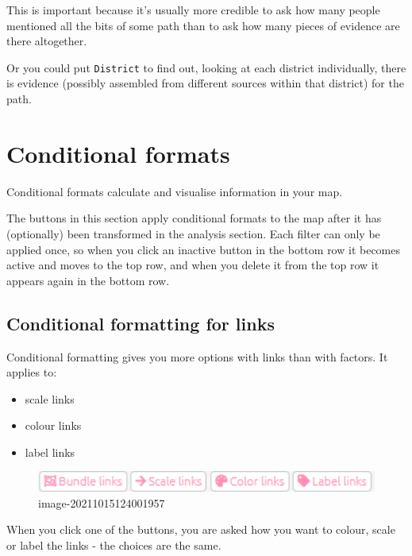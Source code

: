\documentclass[
]{book}
\providecommand{\tightlist}{%
  \setlength{\itemsep}{0pt}\setlength{\parskip}{0pt}}
\begin{document}
This is important because it's usually more credible to ask how many people mentioned all the bits of some path than to ask how many pieces of evidence are there altogether.

Or you could put \texttt{District} to find out, looking at each district individually, there is evidence (possibly assembled from different sources within that district) for the path.

\hypertarget{conditional-formats}{%
\chapter{Conditional formats}\label{conditional-formats}}

Conditional formats calculate and visualise information in your map.

The buttons in this section apply conditional formats to the map after it has (optionally) been transformed in the analysis section. Each filter can only be applied once, so when you click an inactive button in the bottom row it becomes active and moves to the top row, and when you delete it from the top row it appears again in the bottom row.

\hypertarget{xformatting-links}{%
\section{Conditional formatting for links}\label{xformatting-links}}

Conditional formatting gives you more options with links than with factors. It applies to:

\begin{itemize}
\tightlist
\item
  scale links
\item
  colour links
\item
  label links
\end{itemize}

\begin{figure}
\centering
\includegraphics[width=6.77083in,height=\textheight]{_assets/image-20211015124001957.png}
\caption{image-20211015124001957}
\end{figure}

When you click one of the buttons, you are asked how you want to colour, scale or label the links - the choices are the same.
\end{document}
